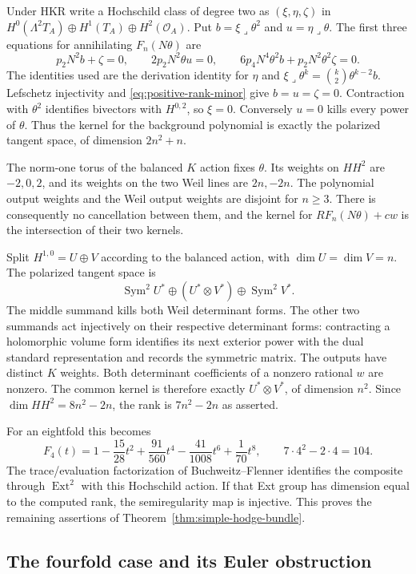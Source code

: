 Under HKR write a Hochschild class of degree two as
$(\xi,\eta,\zeta)$ in
$H^0(\Lambda^2T_A)\oplus H^1(T_A)\oplus H^2(\mathcal O_A)$.
Put $b=\xi\lrcorner\theta^2$ and $u=\eta\lrcorner\theta$.
The first three equations for annihilating $F_n(N\theta)$ are
\[
 p_2N^2b+\zeta=0,\qquad 2p_2N^2\theta u=0,
 \qquad 6p_4N^4\theta^2b+p_2N^2\theta^2\zeta=0.
\]
The identities used are the derivation identity for $\eta$ and
$\xi\lrcorner\theta^k=\binom k2\theta^{k-2}b$.
Lefschetz injectivity and \eqref{eq:positive-rank-minor} give
$b=u=\zeta=0$.  Contraction with $\theta^2$ identifies bivectors
with $H^{0,2}$, so $\xi=0$.  Conversely $u=0$ kills every power
of $\theta$.  Thus the kernel for the background polynomial is
exactly the polarized tangent space, of dimension $2n^2+n$.

The norm-one torus of the balanced $K$ action fixes $\theta$.
Its weights on $HH^2$ are $-2,0,2$, and its weights on the two Weil
lines are $2n,-2n$.  The polynomial output weights and the Weil
output weights are disjoint for $n\ge3$.  There is consequently
no cancellation between them, and the kernel for
$R F_n(N\theta)+cw$ is the intersection of their two kernels.

Split $H^{1,0}=U\oplus V$ according to the balanced action, with
$\dim U=\dim V=n$.  The polarized tangent space is
\[
 \operatorname{Sym}^2U^*\oplus(U^*\otimes V^*)
                         \oplus\operatorname{Sym}^2V^*.
\]
The middle summand kills both Weil determinant forms.  The other
two summands act injectively on their respective determinant forms:
contracting a holomorphic volume form identifies its next exterior
power with the dual standard representation and records the
symmetric matrix.  The outputs have distinct $K$ weights.
Both determinant coefficients of a nonzero rational $w$ are nonzero.
The common kernel is therefore exactly $U^*\otimes V^*$,
of dimension $n^2$.  Since $\dim HH^2=8n^2-2n$, the rank is
$7n^2-2n$ as asserted.

For an eightfold this becomes
\[
 F_4(t)=1-\frac{15}{28}t^2+\frac{91}{560}t^4
               -\frac{41}{1008}t^6+\frac1{70}t^8,
 \qquad 7\cdot4^2-2\cdot4=104.
\]
The trace/evaluation factorization of Buchweitz--Flenner
\cite[Proposition~6.2.1 and Theorem~6.4.2]{BFHH} identifies the
composite through $\operatorname{Ext}^2$ with this Hochschild action.
If that Ext group has dimension equal to the computed rank,
the semiregularity map is injective.  This proves the remaining
assertions of Theorem~\ref{thm:simple-hodge-bundle}.

\subsection{The fourfold case and its Euler obstruction}

